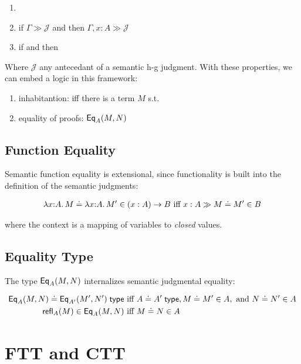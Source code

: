 \documentclass{article} \usepackage{chtt-notes} \usepackage{stmaryrd}
\begin{document}
\begin{enumerate}
\item {}
\item if $\Gamma \gg \mathcal{J}$ and  then $\Gamma,x:A \gg \mathcal{J}$
\item if  and  then 
\end{enumerate} 

Where $\mathcal{J}$ any antecedant of a semantic h-g judgment. With these properties, we can embed a logic in 
this framework: 
\begin{enumerate}
\item inhabitantion:  iff there is a term $M$ s.t. 
\item equality of proofs: $\mathsf{Eq}_{A}(M,N)$
\end{enumerate}

\subsection{Function Equality}

Semantic function equality is extensional, since functionality is built into the definition of the semantic
judgments:

\begin{align*}
\hasEEC{\lam{x}{A}{M}}{\lam{x}{A}{M'}}{\Pitype{x}{A}{B}} &\text{ iff } \hasEEC{x : A}{M}{M'}{B}\\
\end{align*}

where the context is a mapping of variables to \emph{closed} values.

\subsection{Equality Type}

The type $\mathsf{Eq}_{A}(M,N)$ internalizes semantic judgmental equality: 

\begin{align*}
\hasTEC{\Eq{A}{M}{N}}{\Eq{A'}{M'}{N'}} &\text{ iff } \hasTEC{A}{A'}, \hasEEC{M}{M'}{A},\text{ and } \hasEEC{N}{N'}{A}\\
\hasEC{\refl{A}{M}}{\Eq{A}{M}{N}} &\text{ iff } \hasEEC{M}{N}{A}\\
\end{align*}

\section{FTT and CTT}
\end{document}
